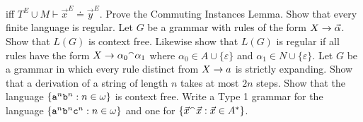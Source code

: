 iff $T^E \cup M \vdash \vec{x}^E\boldsymbol{\doteq}\vec{y}^E$.  
\vplatz
\exercise
{}%
Prove the Commuting Instances Lemma.
\vplatz
\exercise
Show that every finite language is regular.
\vplatz
\exercise
Let $G$ be a grammar with rules of the form $X \rightarrow \vec{\alpha}$.
Show that $L(G)$ is context free. Likewise show that
$L(G)$ is regular if all rules have the form
$X \rightarrow \alpha_0 {^{\smallfrown}} \alpha_1$ where
$\alpha_0 \in A \cup \{\varepsilon\}$ and $\alpha_1
\in N \cup \{\varepsilon\}$.
\vplatz
\exercise
Let $G$ be a grammar in which every rule distinct from
$X \rightarrow a$ is strictly expanding. Show that a derivation
of a string of length $n$ takes at most $2n$ steps.
\vplatz
\exercise
Show that the language
$\{\mbox{\tt a}^n\mbox{\tt b}^n : n \in  \omega\}$
is context free.
\vplatz
\exercise
Write a Type 1 grammar for the language
$\{\mbox{\tt a}^n \mbox{\tt b}^n \mbox{\tt c}^n : n \in \omega\}$
and one for $\{ \vec{x} {^{\smallfrown}} \vec{x} : \vec{x} \in A^{\ast}\}$.
